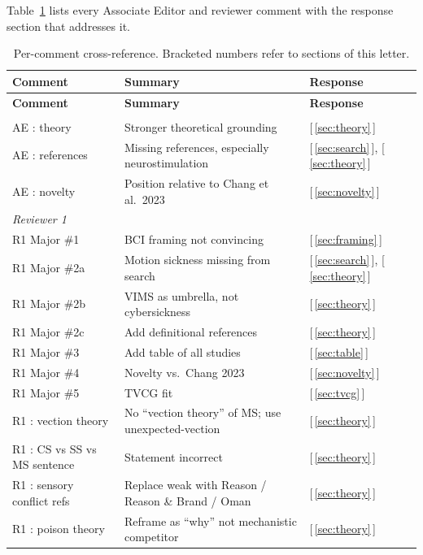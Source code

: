\documentclass[11pt,a4paper]{article}
\newcommand{\xref}[1]{\textcolor{blue!50!black}{[\,#1\,]}}
\begin{document}
Table~\ref{tab:xref} lists every Associate Editor and reviewer comment with the response section that addresses it.

\begin{longtable}{p{} p{} p{}}
\caption{Per-comment cross-reference. Bracketed numbers refer to sections of this letter.}\label{tab:xref}\\
\toprule
\textbf{Comment} & \textbf{Summary} & \textbf{Response} \\
\midrule
\endfirsthead
\toprule
\textbf{Comment} & \textbf{Summary} & \textbf{Response} \\
\midrule
\endhead
\bottomrule
\endfoot

\multicolumn{3}{l}{\textit{Associate Editor}}\\
AE : theory & Stronger theoretical grounding & \xref{\ref{sec:theory}} \\
AE : references & Missing references, especially neurostimulation & \xref{\ref{sec:search}}, \xref{\ref{sec:theory}} \\
AE : novelty & Position relative to Chang et al.\ 2023 & \xref{\ref{sec:novelty}} \\
\midrule
\multicolumn{3}{l}{\textit{Reviewer 1}}\\
R1 Major \#1 & BCI framing not convincing & \xref{\ref{sec:framing}} \\
R1 Major \#2a & Motion sickness missing from search & \xref{\ref{sec:search}}, \xref{\ref{sec:theory}} \\
R1 Major \#2b & VIMS as umbrella, not cybersickness & \xref{\ref{sec:theory}} \\
R1 Major \#2c & Add definitional references & \xref{\ref{sec:theory}} \\
R1 Major \#3 & Add table of all studies & \xref{\ref{sec:table}} \\
R1 Major \#4 & Novelty vs.\ Chang 2023 & \xref{\ref{sec:novelty}} \\
R1 Major \#5 & TVCG fit & \xref{\ref{sec:tvcg}} \\
R1 : vection theory & No ``vection theory'' of MS; use unexpected-vection & \xref{\ref{sec:theory}} \\
R1 : CS vs SS vs MS sentence & Statement incorrect & \xref{\ref{sec:theory}} \\
R1 : sensory conflict refs & Replace weak with Reason / Reason \& Brand / Oman & \xref{\ref{sec:theory}} \\
R1 : poison theory & Reframe as ``why'' not mechanistic competitor & \xref{\ref{sec:theory}} \\

\end{longtable}
\end{document}
